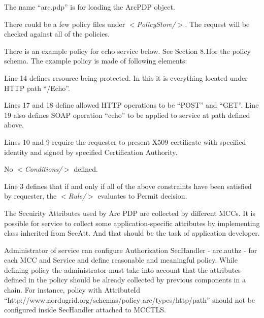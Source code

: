 \documentclass{article}                            %
\begin{document}
The name ``arc.pdp'' is for loading the ArcPDP object.

There could be a few policy files under \textit{$<$PolicyStore/$>$}. The request will be checked against all of the policies.

There is an example policy for echo service below. See Section 8.1for the policy schema. The example policy is  made of following elements: 

  \begin{list}{.}
  {\setlength{\rightmargin}{\leftmargin}}
    \item Line 14  defines resource being protected. In this it is everything located under HTTP path ``/Echo''.
    \item Lines 17 and 18 define allowed HTTP operations to be ``POST'' and ``GET''. Line 19 also defines SOAP operation ``echo'' to be applied to service at path defined above.
    \item Lines 10 and 9 require the requester to present X509 certificate with specified identity and signed by specified Certification Authority.
    \item No \textit{$<$Conditions/$>$} defined.
    \item Line 3 defines that if and only if all of the above constraints have been satisfied by requester, the \textit{$<$Rule/$>$} evaluates to Permit decision.
  \end{list}

The Secuirity Attributes used by Arc PDP are collected by different MCCs. It is possible for service to collect some application-specific attributes by implementing class inherited from SecAtt. And that should be the task of application developer.

Administrator of service can configure Authorization SecHandler - arc.authz - for each MCC and Service and define reasonable and meaningful policy. While defining policy the administrator must take into account that the attributes defined in the policy should be already collected by previous components in a chain. For instance, policy with AttributeId ``http://www.nordugrid.org/schemas/policy-arc/types/http/path'' should not be configured inside SecHandler attached to MCCTLS. 
\end{document}
